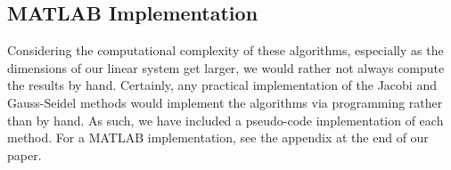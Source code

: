 \documentclass[12pt,letterpaper]{article}
\theoremstyle{definition}
\begin{document}
\subsection{MATLAB Implementation}


Considering the computational complexity of these algorithms, especially as the dimensions of our linear system get larger, we would rather not always compute the results by hand. Certainly, any practical implementation of the Jacobi and Gauss-Seidel methods would implement the algorithms via programming rather than by hand. As such, we have included a pseudo-code implementation of each method. For a MATLAB implementation, see the appendix at the end of our paper.




    
\end{document}
